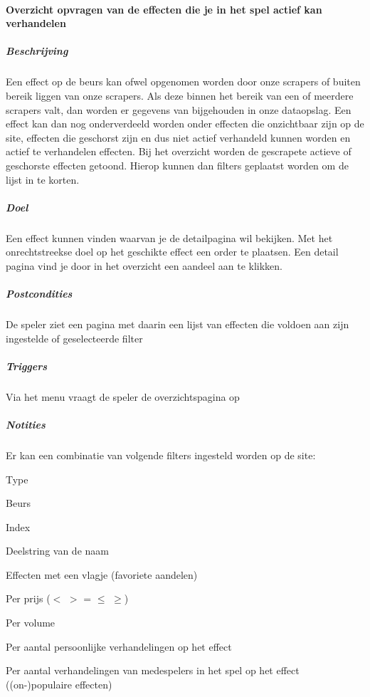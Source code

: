 \paragraph{Overzicht opvragen van de effecten die je in het spel actief kan verhandelen}
\begin{compact}
\subparagraph{Beschrijving} Een effect op de beurs kan ofwel opgenomen worden door onze scrapers of buiten bereik liggen van onze scrapers.
Als deze binnen het bereik van een of meerdere scrapers valt, dan worden er gegevens van bijgehouden in onze dataopslag. Een effect kan dan nog onderverdeeld worden onder effecten die onzichtbaar zijn op de site, effecten die geschorst zijn en dus niet actief verhandeld kunnen worden en actief te verhandelen effecten. Bij het overzicht worden de gescrapete actieve of geschorste effecten getoond. Hierop kunnen dan filters geplaatst worden om de lijst in te korten.
\subparagraph{Doel} Een effect kunnen vinden waarvan je de detailpagina wil bekijken. Met het onrechtstreekse doel op het geschikte effect een order te plaatsen. Een detail pagina vind je door in het overzicht een aandeel aan te klikken.
\subparagraph{Postcondities} De speler ziet een pagina met daarin een lijst van effecten die voldoen aan zijn ingestelde of geselecteerde filter
\subparagraph{Triggers} Via het menu vraagt de speler de overzichtspagina op
\subparagraph{Notities} Er kan een combinatie van volgende filters ingesteld worden op de site:

\begin{itemize_compact}
	\item Type
	\item Beurs
	\item Index
	\item Deelstring van de naam
	\item Effecten met een vlagje (favoriete aandelen)
	\item Per prijs ($<$ $>$ = $\leq$ $\geq$)
	\item Per volume
	\item Per aantal persoonlijke verhandelingen op het effect
	\item Per aantal verhandelingen van medespelers in het spel op het effect ((on-)populaire effecten)
\end{itemize_compact}


\end{compact}
